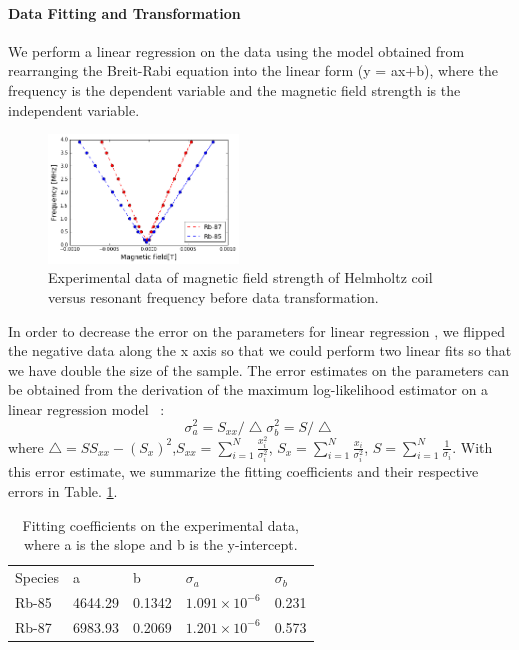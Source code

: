 \documentclass{sigchi}
\begin{document}
\paragraph{Data Fitting and Transformation}
\par We perform a linear regression on the data using the model obtained from rearranging the Breit-Rabi equation into the linear form (y = ax+b), where the frequency is the dependent variable and the magnetic field strength is the independent variable.
\begin{figure}[h]
\includegraphics[width=0.45\textwidth]{plots/all_data.png}
\caption{Experimental data of magnetic field strength of Helmholtz coil versus resonant frequency before data transformation.}
\label{linear_fit}
\end{figure}
\par In order to decrease the error on the parameters for linear regression , we flipped the negative data along the x axis so that we could perform two linear fits so that we have double the size of the sample. The error estimates on the parameters can be obtained from the derivation of the  maximum log-likelihood estimator on a linear regression model ~\cite{num_rec}:
\begin{equation}
\sigma_a ^2 = S_{xx}/\bigtriangleup
\sigma_b^2 = S/\bigtriangleup
\end{equation}
where $\bigtriangleup = SS_{xx}-(S_x)^2$,$ S_{xx} = \sum^N_{i=1}\frac{x_i^2}{\sigma_i^2}$, $S_x = \sum^N_{i=1}\frac{x_i}{\sigma_i^2}$, $S =\sum^N_{i=1}\frac{1}{\sigma_i} $.
With this error estimate,  we summarize the fitting coefficients and their respective errors in Table. \ref{fitting_coefficients}.
\begin{table}[]
\centering
\caption{Fitting coefficients on the experimental data, where a is the slope and b is the y-intercept. }
\label{fitting_coefficients}
\begin{tabular}{lllll}
Species & a       & b      & $\sigma_a$ & $\sigma_b$ \\
Rb-85   & 4644.29 & 0.1342 & $1.091\times 10^{-6}$ & 0.231     \\
Rb-87   & 6983.93 & 0.2069 & $1.201\times 10^{-6}$ & 0.573    
\end{tabular}
\end{table}
\end{document}
